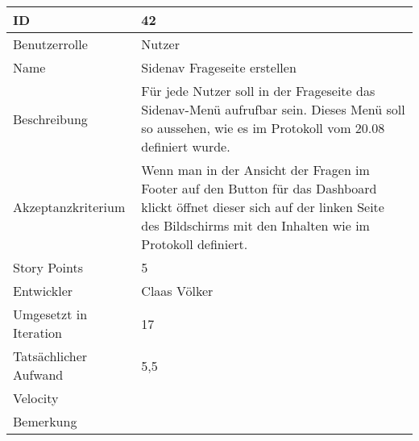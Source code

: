 \begin{tabularx}{\textwidth}{|p{}|X|}
	\hline
	ID & 42 \\
	\hline
	Benutzerrolle & Nutzer \\
	\hline
	Name & Sidenav Frageseite erstellen\\
	\hline
	Beschreibung & Für jede Nutzer soll in der Frageseite das Sidenav-Menü aufrufbar sein. Dieses Menü soll so aussehen, wie es im Protokoll vom 20.08 definiert wurde.\\
	\hline
	Akzeptanzkriterium & Wenn man in der Ansicht der Fragen im Footer auf den Button für das Dashboard klickt öffnet dieser sich auf der linken Seite des Bildschirms mit den Inhalten wie im Protokoll definiert. \\
	\hline
	Story Points & 5\\
	\hline
	Entwickler & Claas Völker\\
	\hline
	Umgesetzt in Iteration & 17\\
	\hline
	Tatsächlicher Aufwand & 5,5\\
	\hline
	Velocity & \\
	\hline
	Bemerkung & \\
	\hline
\end{tabularx}
\vspace{20pt}

